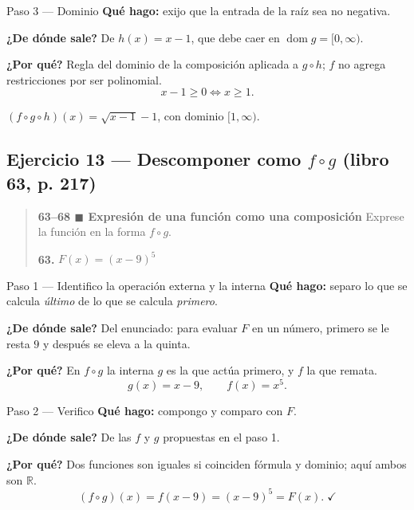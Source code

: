 \documentclass[11pt]{article}
\begin{document}
\begin{paso}{Paso 3 --- Dominio}
\textbf{Qué hago:} exijo que la entrada de la raíz sea no negativa.

\textbf{¿De dónde sale?} De $h(x)=x-1$, que debe caer en $\operatorname{dom} g=[0,\infty)$.

\textbf{¿Por qué?} Regla del dominio de la composición aplicada a $g\circ h$; $f$ no agrega restricciones por ser polinomial.
\[
x-1\ge 0 \iff x\ge 1 .
\]
\end{paso}

\begin{resp}
$(f\circ g\circ h)(x)=\sqrt{x-1}-1$, con dominio $[1,\infty)$.
\end{resp}

\subsection*{Ejercicio 13 — Descomponer como $f\circ g$ (libro 63, p. 217)}

\begin{quote}
\textbf{63--68 $\blacksquare$ Expresión de una función como una composición} \quad Exprese la función en la forma $f\circ g$.

\textbf{63.} $F(x)=(x-9)^5$
\end{quote}

\begin{paso}{Paso 1 --- Identifico la operación externa y la interna}
\textbf{Qué hago:} separo lo que se calcula \emph{último} de lo que se calcula \emph{primero}.

\textbf{¿De dónde sale?} Del enunciado: para evaluar $F$ en un número, primero se le resta $9$ y después se eleva a la quinta.

\textbf{¿Por qué?} En $f\circ g$ la interna $g$ es la que actúa primero, y $f$ la que remata.
\[
g(x)=x-9,\qquad f(x)=x^5 .
\]
\end{paso}

\begin{paso}{Paso 2 --- Verifico}
\textbf{Qué hago:} compongo y comparo con $F$.

\textbf{¿De dónde sale?} De las $f$ y $g$ propuestas en el paso 1.

\textbf{¿Por qué?} Dos funciones son iguales si coinciden fórmula y dominio; aquí ambos son $\mathbb{R}$.
\[
(f\circ g)(x)=f(x-9)=(x-9)^5=F(x).\;\checkmark
\]
\end{paso}
\end{document}
